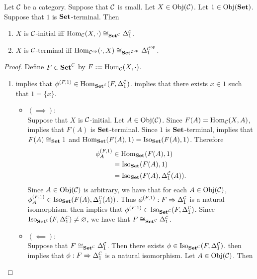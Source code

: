 \documentclass{book}
\begin{document}
\begin{ex} 
	Let $\mathcal{C}$ be a category. Suppose that $\mathcal{C}$ is small. Let $X \in \operatorname{Obj}(\mathcal{C})$. Let $1 \in \operatorname{Obj}(\text{\textbf{Set}})$. Suppose that $1$ is $\text{\textbf{Set}}$-terminal. Then
	\begin{enumerate}
		\item $X$ is $\mathcal{C}$-initial iff $\operatorname{Hom}_{\mathcal{C}}(X, \cdot) \cong_{\text{\textbf{Set}}^{\mathcal{C}}} \Delta^{\mathcal{C}}_1$.
		\item $X$ is $\mathcal{C}$-terminal iff $\operatorname{Hom}_{{\mathcal{C}}^{\text{op}}}(\cdot, X) \cong_{\text{\textbf{Set}}^{{\mathcal{C}}^{\text{op}}}} \Delta^{{\mathcal{C}}^{\text{op}}}_1$.
	\end{enumerate}
\end{ex}

\begin{proof}
	Define $F \in \text{\textbf{Set}}^{\mathcal{C}}$ by $F \vcentcolon= \operatorname{Hom}_{\mathcal{C}}(X, \cdot)$.
	\begin{enumerate}
		\item {} implies that $\phi^{(F,1)} \in \operatorname{Hom}_{\text{\textbf{Set}}^{\mathcal{C}}}(F, \Delta^{\mathcal{C}}_1)$.  implies that there exists $x \in 1$ such that $1 = \{x\}$.
		\begin{itemize}
			\item $(\implies)$: \\
			Suppose that $X$ is $\mathcal{C}$-initial. Let $A \in \operatorname{Obj}(\mathcal{C})$. Since $F(A) = \operatorname{Hom}_{\mathcal{C}}(X, A)$,  implies that $F(A)$ is $\text{\textbf{Set}}$-terminal. Since $1$ is $\text{\textbf{Set}}$-terminal,  implies that $F(A) \cong_{\text{\textbf{Set}}} 1$ and $\operatorname{Hom}_{\text{\textbf{Set}}}(F(A), 1) = \operatorname{Iso}_{\text{\textbf{Set}}}(F(A), 1)$. Therefore 
			\begin{align*}
				\phi^{(F,1)}_A 
				& \in \operatorname{Hom}_{\text{\textbf{Set}}}(F(A), 1) \\
				& = \operatorname{Iso}_{\text{\textbf{Set}}}(F(A), 1) \\
				& = \operatorname{Iso}_{\text{\textbf{Set}}}(F(A), \Delta^{\mathcal{C}}_1(A)).
			\end{align*}
			Since $A \in \operatorname{Obj}(\mathcal{C})$ is arbitrary, we have that for each $A \in \operatorname{Obj}(\mathcal{C})$, $\phi^{(F,1)}_A \in \operatorname{Iso}_{\text{\textbf{Set}}}(F(A), \Delta^{\mathcal{C}}_1(A))$. Thus $\phi^{(F,1)}:F \Rightarrow \Delta^{\mathcal{C}}_1$ is a natural isomorphism.  then implies that $\phi^{(F,1)} \in \operatorname{Iso}_{\text{\textbf{Set}}^{\mathcal{C}}}(F, \Delta^{\mathcal{C}}_1)$. Since $\operatorname{Iso}_{\text{\textbf{Set}}^{\mathcal{C}}}(F, \Delta^{\mathcal{C}}_1) \neq \varnothing$, we have that $F \cong_{\text{\textbf{Set}}^{\mathcal{C}}} \Delta^{\mathcal{C}}_1$.
			\item $(\impliedby)$: \\
			Suppose that $F \cong_{\text{\textbf{Set}}^{\mathcal{C}}} \Delta^{\mathcal{C}}_1$. Then there exists $\phi \in \operatorname{Iso}_{\text{\textbf{Set}}^{\mathcal{C}}}(F, \Delta^{\mathcal{C}}_1)$.  then implies that $\phi: F \Rightarrow \Delta^{\mathcal{C}}_1$ is a natural isomorphism. Let $A \in \operatorname{Obj}(\mathcal{C})$. Then 

\end{itemize}
\end{enumerate}
\end{proof}
\end{document}
